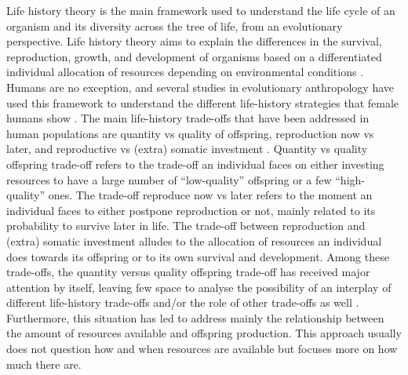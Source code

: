 \documentclass{article}
\begin{document}
Life history theory is the main framework used to understand the life cycle of an organism and its diversity across the tree of life,  from an evolutionary perspective. Life history theory aims to explain the differences in the survival, reproduction, growth, and development of organisms based on a differentiated individual allocation of resources depending on environmental conditions \citep{stearns2000life}. Humans are no exception, and several studies in evolutionary anthropology have used this framework to understand the different life-history strategies that female humans show \citep{mace2000evolutionary,borgerhoff2012human}. The main life-history trade-offs that have been addressed in human populations are quantity vs quality of offspring, reproduction now vs later, and reproductive vs (extra) somatic investment \citep{hill1999life}. Quantity vs quality offspring trade-off refers to the trade-off an individual faces on either investing resources to have a large number of “low-quality” offspring or a few “high-quality” ones. The trade-off reproduce now vs later refers to the moment an individual faces to either postpone reproduction or not, mainly related to its probability to survive later in life. The trade-off between reproduction and (extra) somatic investment alludes to the allocation of resources an individual does towards its offspring or to its own survival and development. Among these trade-offs, the quantity versus quality offspring trade-off has received major attention by itself, leaving few space to analyse the possibility of an interplay of different life-history trade-offs and/or the role of other trade-offs as well \citep{lawson2016offspring}. Furthermore, this situation has led to address mainly the relationship between the amount of resources available and offspring production. This approach usually does not question how and when resources are available but focuses more on how much there are.
\\\\
\end{document}
